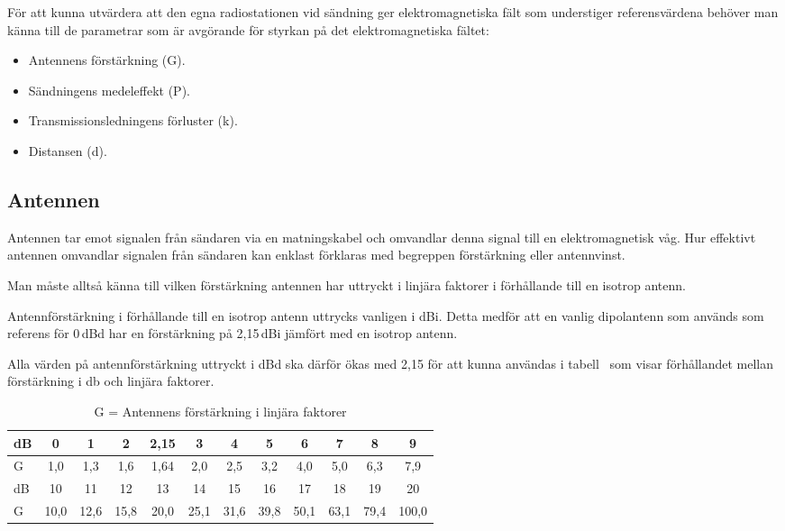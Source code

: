 För att kunna utvärdera att den egna radiostationen vid sändning ger
elektromagnetiska fält som understiger referensvärdena behöver man känna till
de parametrar som är avgörande för styrkan på det elektromagnetiska fältet:

\begin{itemize}
  \item Antennens förstärkning (G).
  \item Sändningens medeleffekt (P).
  \item Transmissionsledningens förluster (k).
  \item Distansen (d).
\end{itemize}

\subsection{Antennen}
Antennen tar emot signalen från sändaren via en matningskabel och
omvandlar denna signal till en elektromagnetisk våg.
Hur effektivt antennen omvandlar signalen från sändaren kan enklast förklaras
med begreppen förstärkning eller antennvinst.

Man måste alltså känna till vilken förstärkning antennen har uttryckt i linjära
faktorer i förhållande till en isotrop antenn.

Antennförstärkning i förhållande till en isotrop antenn uttrycks vanligen i dBi.
Detta medför att en vanlig dipolantenn som används som referens för 0\,dBd har
en förstärkning på 2,15\,dBi jämfört med en isotrop antenn.

Alla värden på antennförstärkning uttryckt i dBd ska därför ökas med 2,15 för
att kunna användas i tabell~ som visar förhållandet mellan
förstärkning i \unit{\decibel} och linjära faktorer.

\begin{table*}[ht]
  \begin{center}
    \begin{tabular}{|l|ccccccccccc|}
	\hline
	dB     &  0  &  1  &  2 & 2,15 &  3  &  4  &  5  &  6  &  7  &  8  &  9  \\ \hline
	G & 1,0 & 1,3 & 1,6 & 1,64 & 2,0 & 2,5 & 3,2 & 4,0 & 5,0 & 6,3 & 7,9 \\ \hline
	dB     &  10  &  11  &  12  &  13  &  14  &  15  &  16  &  17  &  18  &  19  &  20 \\ \hline
	G & 10,0 & 12,6 & 15,8 & 20,0 & 25,1 & 31,6 & 39,8 & 50,1 & 63,1 & 79,4 & 100,0 \\ \hline
    \end{tabular}
    \caption{G = Antennens förstärkning i linjära faktorer}
    \label{tab:forst}
  \end{center}
\end{table*}


